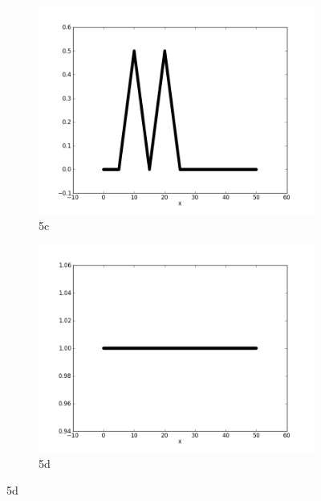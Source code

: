 \documentclass{report}
\begin{document}
\begin{figure}[ht]
\begin{subfigure}[b]{0.5\textwidth}
                \includegraphics[width=\textwidth]{ex5c.png}
                \caption{5c}
	\end{subfigure}
	\begin{subfigure}[b]{0.5\textwidth}
                \centering
                \includegraphics[width=\textwidth]{ex5d.png}
                \caption{5d}
	\end{subfigure}
\end{figure}


\newpage

\end{document}
